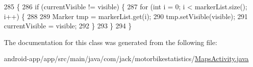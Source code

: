 \begin{DoxyCode}
285                                                         \{
286             \textcolor{keywordflow}{if} (currentVisible != visible) \{
287                 \textcolor{keywordflow}{for} (\textcolor{keywordtype}{int} i = 0; i < markerList.size(); i++) \{
288 
289                     Marker tmp = markerList.get(i);
290                     tmp.setVisible(visible);
291                     currentVisible = visible;
292                 \}
293             \}
294         \}
\end{DoxyCode}


The documentation for this class was generated from the following file\+:\begin{DoxyCompactItemize}
\item 
android-\/app/app/src/main/java/com/jack/motorbikestatistics/\hyperlink{_maps_activity_8java}{Maps\+Activity.\+java}\end{DoxyCompactItemize}
